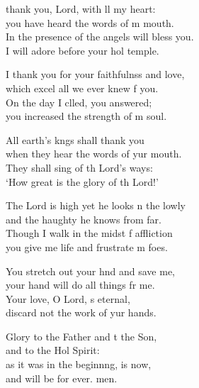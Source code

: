 \settowidth{\versewidth}{In the presence of the angels I will bless you. *}
\begin{psalmverse}%
  \begin{patverse}
 thank you, Lord, with ll my heart:\Med\\
you have heard the words of m mouth.\\
In the presence of the angels  will bless you.\Med\\
I will adore before your hol temple.

I thank you for your faithfulnss and love,\Med\\
which excel all we ever knew f you.\\
On the day I clled, you answered;\Med\\
you increased the strength of m soul.

All earth’s k\pointup{\i}ngs shall thank you\Med\\
when they hear the words of yur mouth.\\
They shall sing of th Lord’s ways:\Med\\
‘How great is the glory of th Lord!’

The Lord is high yet he looks n the lowly\Med\\
and the haughty he knows from far.\\
Though I walk in the midst f affliction\Med\\
you give me life and frustrate m foes.

You stretch out your hnd and save me,\Med\\
your hand will do all things fr me.\\
Your love, O Lord, \pointup{\i}s eternal,\Med\\
discard not the work of yur hands.

Glory to the Father and t the Son,\Med\\
and to the Hol Spirit:\\
as it was in the beginn\pointup{\i}ng, is now,\Med\\
and will be for ever. men.
  \end{patverse}
\end{psalmverse}
